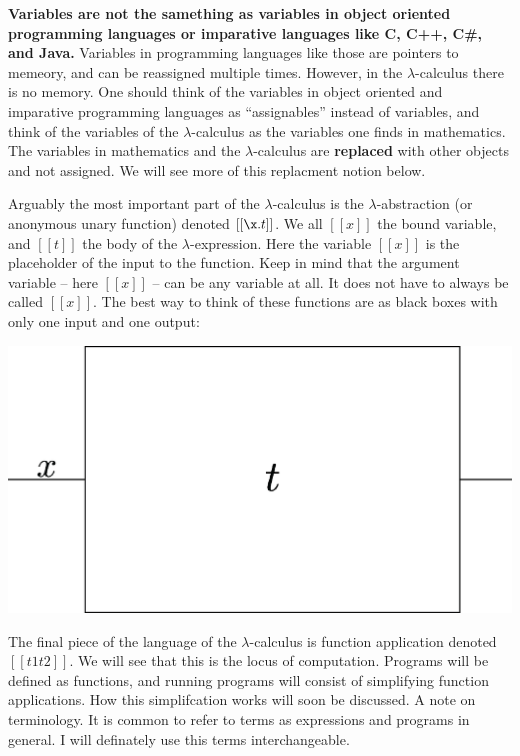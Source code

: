 \documentclass{article}
\begin{document}
\textbf{Variables are not the samething as variables in object
  oriented programming languages or imparative languages like C, C++,
  C\#, and Java.}  Variables in programming languages like those are
pointers to memeory, and can be reassigned multiple times.  However,
in the $\lambda$-calculus there is no memory.  One should think of the
variables in object oriented and imparative programming languages as
``assignables'' instead of variables, and think of the variables of
the $\lambda$-calculus as the variables one finds in mathematics.  The
variables in mathematics and the $\lambda$-calculus are
\textbf{replaced} with other objects and not assigned.  We will see
more of this replacment notion below.

Arguably the most important part of the $\lambda$-calculus is the
$\lambda$-abstraction (or anonymous unary function) denoted
$[[\x.t]]$.  We all $[[x]]$ the bound variable, and $[[t]]$ the body of
the $\lambda$-expression.  Here the variable $[[x]]$ is the
placeholder of the input to the function.  Keep in mind that the
argument variable -- here $[[x]]$ -- can be any variable at all.  It
does not have to always be called $[[x]]$. The best way to think of
these functions are as black boxes with only one input and one output:
\begin{center}
  \includegraphics[scale=0.3]{black-blox}
\end{center}

The final piece of the language of the $\lambda$-calculus is function
application denoted $[[t1 t2]]$.  We will see that this is the locus
of computation.  Programs will be defined as functions, and running
programs will consist of simplifying function applications.  How this
simplifcation works will soon be discussed.  A note on terminology.
It is common to refer to terms as expressions and programs in general.
I will definately use this terms interchangeable.
\end{document}
